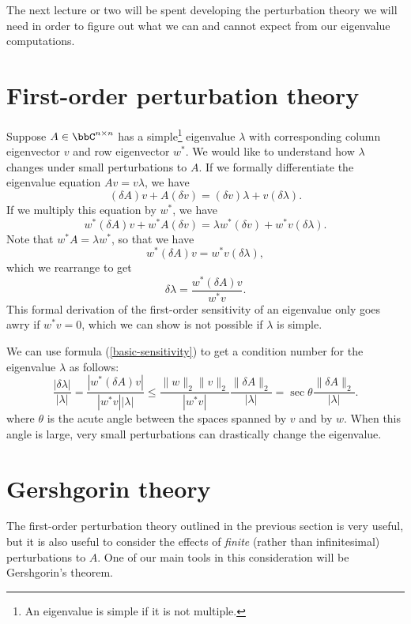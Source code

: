 \documentclass[12pt, leqno]{article} %
\begin{document}
The next lecture or two will be spent developing the perturbation
theory we will need in order to figure out what we can and cannot
expect from our eigenvalue computations.

\section{First-order perturbation theory}

Suppose $A \in \bbC^{n \times n}$ has a simple\footnote{
  An eigenvalue is simple if it is not multiple.
} eigenvalue $\lambda$ with corresponding column
eigenvector $v$ and row eigenvector $w^*$.
We would like to understand how $\lambda$ changes under
small perturbations to $A$.  If we formally differentiate
the eigenvalue equation $A v = v \lambda$, we have
\[
  (\delta A) v + A (\delta v) = (\delta v) \lambda + v (\delta \lambda).
\]
If we multiply this equation by $w^*$, we have
\[
  w^* (\delta A) v + w^* A (\delta v) =
  \lambda w^* (\delta v) + w^* v (\delta \lambda).
\]
Note that $w^* A = \lambda w^*$, so that we have
\[
  w^* (\delta A) v = w^* v (\delta \lambda),
\]
which we rearrange to get
\begin{equation} \label{basic-sensitivity}
  \delta \lambda = \frac{w^* (\delta A) v}{w^* v}.
\end{equation}
This formal derivation of the first-order sensitivity of an
eigenvalue only goes awry if $w^* v = 0$, which we can show is
not possible if $\lambda$ is simple.

We can use formula (\ref{basic-sensitivity}) to get a condition
number for the eigenvalue $\lambda$ as follows:
\[
  \frac{|\delta \lambda|}{|\lambda|}
   = \frac{|w^* (\delta A) v|}{|w^* v| |\lambda|}
    \leq \frac{\|w\|_2 \|v\|_2}{|w^* v|} \frac{\|\delta A\|_2}{|\lambda|}
    = \sec \theta \frac{\|\delta A\|_2}{|\lambda|}.
\]
where $\theta$ is the acute angle between the spaces spanned by $v$ and by $w$.
When this angle is large, very small perturbations can drastically change the
eigenvalue.

\section{Gershgorin theory}

The first-order perturbation theory outlined in the previous section
is very useful, but it is also useful to consider the effects of
{\em finite} (rather than infinitesimal) perturbations to $A$.  One of
our main tools in this consideration will be Gershgorin's theorem.
\end{document}
